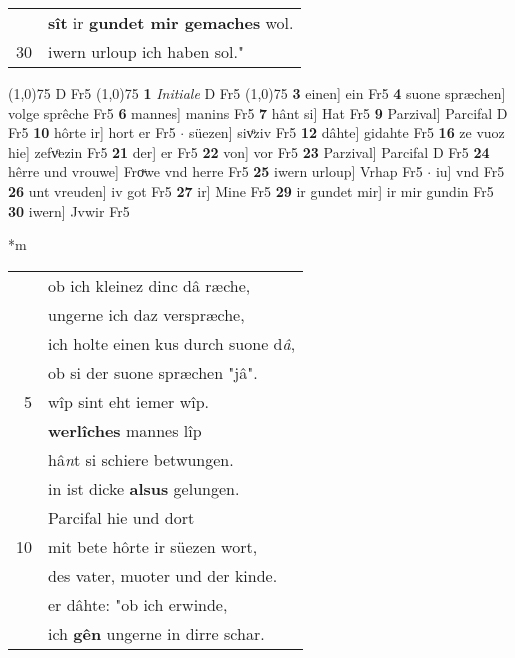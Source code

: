 \documentclass[8pt,a4paper,notitlepage]{article}
\begin{document}
\begin{table}[ht]
\begin{minipage}[t]{0.5\linewidth}
\begin{tabular}{rl}
 & \textbf{sît} ir \textbf{gundet mir gemaches} wol.\\ 
30 & iwern urloup ich haben sol."\\ 
\end{tabular}
\scriptsize
\line(1,0){75} \newline
D Fr5 \newline
\line(1,0){75} \newline
\textbf{1} \textit{Initiale} D Fr5  \newline
\line(1,0){75} \newline
\textbf{3} einen] ein Fr5 \textbf{4} suone spræchen] volge sprêche Fr5 \textbf{6} mannes] manins Fr5 \textbf{7} hânt si] Hat Fr5 \textbf{9} Parzival] Parcifal D Fr5 \textbf{10} hôrte ir] hort er Fr5  $\cdot$ süezen] sivͦziv Fr5 \textbf{12} dâhte] gidahte Fr5 \textbf{16} ze vuoz hie] zefvͦezin Fr5 \textbf{21} der] er Fr5 \textbf{22} von] vor Fr5 \textbf{23} Parzival] Parcifal D Fr5 \textbf{24} hêrre und vrouwe] Froͮwe vnd herre Fr5 \textbf{25} iwern urloup] Vrhap Fr5  $\cdot$ iu] vnd Fr5 \textbf{26} unt vreuden] iv got Fr5 \textbf{27} ir] Mine Fr5 \textbf{29} ir gundet mir] ir mir gundin Fr5 \textbf{30} iwern] Jvwir Fr5 \newline
\end{minipage}
\hspace{0.5cm}
\begin{minipage}[t]{0.5\linewidth}
\small
\begin{center}*m
\end{center}
\begin{tabular}{rl}
 & ob ich kleinez dinc dâ ræche,\\ 
 & ungerne ich daz verspræche,\\ 
 & ich holte einen kus durch suone d\textit{â},\\ 
 & ob si der suone spræchen "jâ".\\ 
5 & wîp sint eht iemer wîp.\\ 
 & \textbf{werlîches} mannes lîp\\ 
 & hâ\textit{n}t si schiere betwungen.\\ 
 & in ist dicke \textbf{alsus} gelungen.\\ 
 & Parcifal hie und dort\\ 
10 & mit bete hôrte ir süezen wort,\\ 
 & des vater, muoter und der kinde.\\ 
 & er dâhte: "ob ich erwinde,\\ 
 & ich \textbf{gên} ungerne in dirre schar.\\ 

\end{tabular}
\end{minipage}
\end{table}
\end{document}

